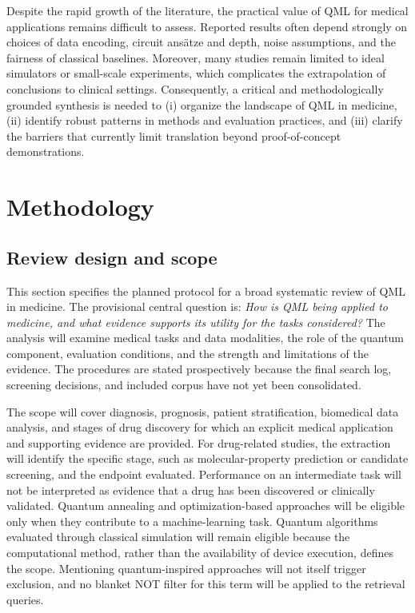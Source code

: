 \documentclass[pdflatex,bst/sn-mathphys-num]{sn-jnl}
\begin{document}
Despite the rapid growth of the literature, the practical value of QML for medical applications remains difficult to assess. Reported results often depend strongly on choices of data encoding, circuit ans\"atze and depth, noise assumptions, and the fairness of classical baselines. Moreover, many studies remain limited to ideal simulators or small-scale experiments, which complicates the extrapolation of conclusions to clinical settings. Consequently, a critical and methodologically grounded synthesis is needed to (i) organize the landscape of QML in medicine, (ii) identify robust patterns in methods and evaluation practices, and (iii) clarify the barriers that currently limit translation beyond proof-of-concept demonstrations.


\section{Methodology}\label{sec:method}

\subsection{Review design and scope}\label{sec:review-design}

This section specifies the planned protocol for a broad systematic review of QML in medicine. The provisional central question is: \emph{How is QML being applied to medicine, and what evidence supports its utility for the tasks considered?} The analysis will examine medical tasks and data modalities, the role of the quantum component, evaluation conditions, and the strength and limitations of the evidence. The procedures are stated prospectively because the final search log, screening decisions, and included corpus have not yet been consolidated.

The scope will cover diagnosis, prognosis, patient stratification, biomedical data analysis, and stages of drug discovery for which an explicit medical application and supporting evidence are provided. For drug-related studies, the extraction will identify the specific stage, such as molecular-property prediction or candidate screening, and the endpoint evaluated. Performance on an intermediate task will not be interpreted as evidence that a drug has been discovered or clinically validated. Quantum annealing and optimization-based approaches will be eligible only when they contribute to a machine-learning task. Quantum algorithms evaluated through classical simulation will remain eligible because the computational method, rather than the availability of device execution, defines the scope. Mentioning quantum-inspired approaches will not itself trigger exclusion, and no blanket NOT filter for this term will be applied to the retrieval queries.
\end{document}
